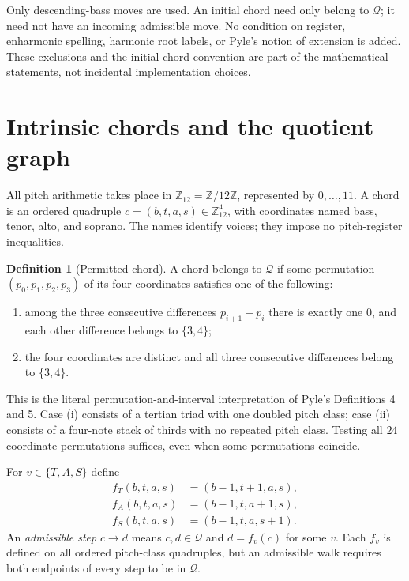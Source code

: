 \documentclass[11pt,letterpaper]{article}
\theoremstyle{definition}\newtheorem{definition}[theorem]{Definition}
\newcommand{\Z}{\mathbb Z}
\newcommand{\Q}{\mathcal Q}
\begin{document}
Only descending-bass moves are used. An initial chord need only belong to $\Q$; it need not have an incoming admissible move. No condition on register, enharmonic spelling, harmonic root labels, or Pyle's notion of extension is added. These exclusions and the initial-chord convention are part of the mathematical statements, not incidental implementation choices.

\clearpage
\section{Intrinsic chords and the quotient graph}
All pitch arithmetic takes place in $\Z_{12}=\Z/12\Z$, represented by $0,\ldots,11$. A chord is an ordered quadruple $c=(b,t,a,s)\in\Z_{12}^4$, with coordinates named bass, tenor, alto, and soprano. The names identify voices; they impose no pitch-register inequalities.

\begin{definition}[Permitted chord]
A chord belongs to $\Q$ if some permutation $(p_0,p_1,p_2,p_3)$ of its four coordinates satisfies one of the following:
\begin{enumerate}[label=(\roman*)]
\item among the three consecutive differences $p_{i+1}-p_i$ there is exactly one $0$, and each other difference belongs to $\{3,4\}$;
\item the four coordinates are distinct and all three consecutive differences belong to $\{3,4\}$.
\end{enumerate}
\end{definition}
This is the literal permutation-and-interval interpretation of Pyle's Definitions 4 and 5. Case (i) consists of a tertian triad with one doubled pitch class; case (ii) consists of a four-note stack of thirds with no repeated pitch class. Testing all $24$ coordinate permutations suffices, even when some permutations coincide.

For $v\in\{T,A,S\}$ define
\begin{align*}
f_T(b,t,a,s)&=(b-1,t+1,a,s),\\
f_A(b,t,a,s)&=(b-1,t,a+1,s),\\
f_S(b,t,a,s)&=(b-1,t,a,s+1).
\end{align*}
An \emph{admissible step} $c\to d$ means $c,d\in\Q$ and $d=f_v(c)$ for some $v$. Each $f_v$ is defined on all ordered pitch-class quadruples, but an admissible walk requires both endpoints of every step to be in $\Q$.
\end{document}
